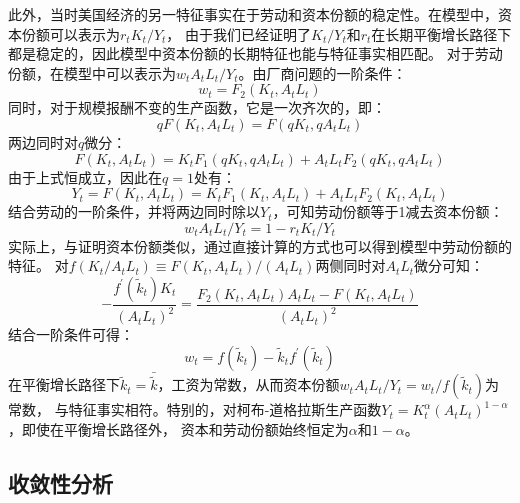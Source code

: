 此外，当时美国经济的另一特征事实在于劳动和资本份额的稳定性。在模型中，资本份额可以表示为$r_tK_t/Y_t$，
由于我们已经证明了$K_t/Y_t$和$r_t$在长期平衡增长路径下都是稳定的，因此模型中资本份额的长期特征也能与特征事实相匹配。
对于劳动份额，在模型中可以表示为$w_tA_tL_t/Y_t$。由厂商问题的一阶条件：
\begin{equation*}
    w_t = F_2\left(K_t, A_tL_t\right)
\end{equation*}
同时，对于规模报酬不变的生产函数，它是一次齐次的，即：
\begin{equation*}
    qF\left(K_t,A_tL_t\right) = F\left(qK_t,qA_tL_t\right)
\end{equation*}
两边同时对$q$微分：
\begin{equation*}
    F\left(K_t,A_tL_t\right) = K_tF_1\left(qK_t,qA_tL_t\right) + A_tL_tF_2\left(qK_t,qA_tL_t\right)
\end{equation*}
由于上式恒成立，因此在$q=1$处有：
\begin{equation*}
    Y_t = F\left(K_t,A_tL_t\right) = K_tF_1\left(K_t,A_tL_t\right) + A_tL_tF_2\left(K_t,A_tL_t\right)
\end{equation*}
结合劳动的一阶条件，并将两边同时除以$Y_t$，可知劳动份额等于1减去资本份额：
\begin{equation*}
    w_tA_tL_t/Y_t = 1 - r_tK_t/Y_t
\end{equation*}
实际上，与证明资本份额类似，通过直接计算的方式也可以得到模型中劳动份额的特征。
对$f(K_t/A_tL_t) \equiv F\left(K_t, A_tL_t\right)/(A_tL_t)$两侧同时对$A_tL_t$微分可知：
\begin{equation*}
    -\frac{f^{\prime}(\tilde{k}_t)K_t}{(A_tL_t)^2} 
        = \frac{F_2(K_t,A_tL_t)A_tL_t - F\left(K_t, A_tL_t\right)}{(A_tL_t)^2}
\end{equation*}
结合一阶条件可得：
\begin{equation*}
    w_t = f(\tilde{k}_t) - \tilde{k}_tf^{\prime}(\tilde{k}_t)
\end{equation*}
在平衡增长路径下$\tilde{k}_t=\bar{\tilde{k}}$，工资为常数，从而资本份额$w_tA_tL_t/Y_t=w_t/f(\tilde{k}_t)$为常数，
与特征事实相符。特别的，对柯布-道格拉斯生产函数$Y_t=K_t^{\alpha}(A_tL_t)^{1-\alpha}$，即使在平衡增长路径外，
资本和劳动份额始终恒定为$\alpha$和$1-\alpha$。


\subsection{收敛性分析}


